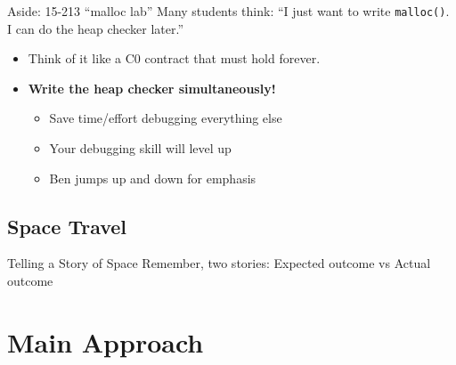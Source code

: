 \documentclass[xcolor=dvipsnames]{beamer}
\begin{document}
\begin{frame}{Aside: 15-213 ``malloc lab''}
	Many students think: ``I just want to write \texttt{malloc()}. I can do the heap checker later.''
	\pause
	\begin{itemize}
		\item Think of it like a C0 contract that must hold forever.
		\item \textbf{Write the heap checker simultaneously!}
			\pause
			\begin{itemize}
				\item Save time/effort debugging everything else
				\item Your debugging skill will level up
				\item Ben jumps up and down for emphasis
			\end{itemize}
	\end{itemize}
\end{frame}

\subsection{Space Travel}


\begin{frame}{Telling a Story of Space}
	Remember, two stories: Expected outcome vs Actual outcome

	\linegap
\end{frame}

\section{Main Approach}
\end{document}
